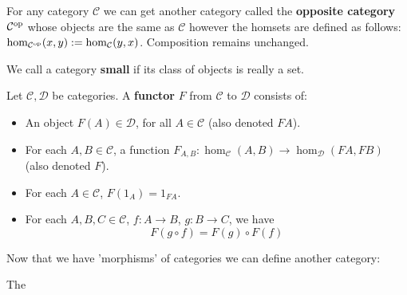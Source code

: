 \begin{example}
	For any category $\mathcal{C}$ we can get another category called the {\bf opposite category} $\mathcal{C}^{\mathrm{op}}$ whose objects are the same as $\mathcal{C}$ however the homsets are defined as follows: $\hom_{\mathcal{C}^{\mathrm{op}}}(x,y):=\hom_{\mathcal{C}}(y,x)$. Composition remains unchanged.
\end{example}

\begin{defin}
	We call a category {\bf small} if its class of objects is really a set.
\end{defin}

\begin{defin}
	Let $\mathcal{C},\mathcal{D}$ be categories. A {\bf functor} $F$ from $\mathcal{C}$ to $\mathcal{D}$ consists of:
	
	\begin{itemize}
		\item An object $F(A)\in \mathcal{D}$, for all $A \in \mathcal{C}$ (also denoted $FA$).
		\item For each $A,B \in \mathcal{C}$, a function $F_{A,B} : \hom_{\mathcal{C}}(A,B) \to \hom_{\mathcal{D}}(FA,FB)$ (also denoted $F$).
		\item For each $A \in \mathcal{C}$, $F(1_A) = 1_{FA}$.
		\item For each $A,B,C \in \mathcal{C}$, $f : A \to B$, $g : B \to C$, we have $$F(g \circ f) = F(g)\circ F(f)$$
	\end{itemize}
\end{defin}

Now that we have 'morphisms' of categories we can define another category:

\begin{example}
	The 
\end{example}
